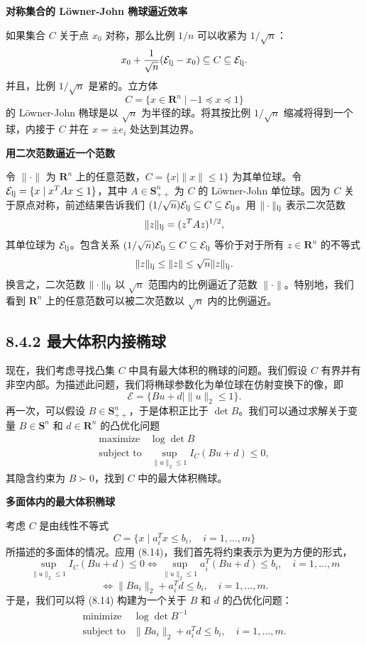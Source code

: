 \documentclass[UTF8, 12pt, fontset=fandol, oneside]{ctexart}
\begin{document}
\noindent\textbf{对称集合的 Löwner-John 椭球逼近效率}

如果集合 $C$ 关于点 $x_0$ 对称，那么比例 $1/n$ 可以收紧为 $1/\sqrt{n}$：
\[
x_0+\frac{1}{\sqrt{n}}(\mathcal{E}_{\rm lj}-x_0)\subseteq C\subseteq \mathcal{E}_{\rm lj}.
\]
并且，比例 $1/\sqrt{n}$ 是紧的。立方体
\[
C=\{x\in\mathbf{R}^n\mid -1\preceq x\preceq 1\}
\]
的 Löwner-John 椭球是以 $\sqrt{n}$ 为半径的球。将其按比例 $1/\sqrt{n}$ 缩减将得到一个球，内接于 $C$ 并在 $x=\pm e_i$ 处达到其边界。

\noindent\textbf{用二次范数逼近一个范数}

令 $\|\cdot\|$ 为 $\mathbf{R}^n$ 上的任意范数，$C=\{x\mid \|x\|\leq 1\}$ 为其单位球。令 $\mathcal{E}_{\rm lj}=\{x\mid x^TAx\leq 1\}$，其中 $A\in\mathbf{S}_{++}^n$ 为 $C$ 的 Löwner-John 单位球。因为 $C$ 关于原点对称，前述结果告诉我们 $(1/\sqrt{n})\mathcal{E}_{\rm lj}\subseteq C\subseteq \mathcal{E}_{\rm lj}$。用 $\|\cdot\|_{\rm lj}$ 表示二次范数
\[
\|z\|_{\rm lj}=(z^TAz)^{1/2},
\]
其单位球为 $\mathcal{E}_{\rm lj}$。包含关系 $(1/\sqrt{n})\mathcal{E}_{\rm lj}\subseteq C\subseteq \mathcal{E}_{\rm lj}$ 等价于对于所有 $z\in\mathbf{R}^n$ 的不等式
\[
\|z\|_{\rm lj}\leq \|z\|\leq \sqrt{n}\|z\|_{\rm lj}.
\]
换言之，二次范数 $\|\cdot\|_{\rm lj}$ 以 $\sqrt{n}$ 范围内的比例逼近了范数 $\|\cdot\|$。特别地，我们看到 $\mathbf{R}^n$ 上的任意范数可以被二次范数以 $\sqrt{n}$ 内的比例逼近。

\subsection*{8.4.2 最大体积内接椭球}

现在，我们考虑寻找凸集 $C$ 中具有最大体积的椭球的问题。我们假设 $C$ 有界并有非空内部。为描述此问题，我们将椭球参数化为单位球在仿射变换下的像，即
\[
\mathcal{E}=\{Bu+d\mid \|u\|_2\leq 1\}.
\]
再一次，可以假设 $B\in\mathbf{S}_{++}^n$，于是体积正比于 $\det B$。我们可以通过求解关于变量 $B\in\mathbf{S}^n$ 和 $d\in\mathbf{R}^n$ 的凸优化问题
\[
\begin{array}{ll}
\mbox{maximize} & \log\det B\\
\mbox{subject to} & \sup_{\|u\|_2\leq 1} I_C(Bu+d)\leq 0,
\end{array}
\tag{8.14}
\]
其隐含约束为 $B\succ 0$，找到 $C$ 中的最大体积椭球。

\noindent\textbf{多面体内的最大体积椭球}

考虑 $C$ 是由线性不等式
\[
C=\{x\mid a_i^Tx\leq b_i,\quad i=1,\ldots,m\}
\]
所描述的多面体的情况。应用 (8.14)，我们首先将约束表示为更为方便的形式，
\[
\sup_{\|u\|_2\leq 1} I_C(Bu+d)\leq 0
\Longleftrightarrow
\sup_{\|u\|_2\leq 1} a_i^T(Bu+d)\leq b_i,\quad i=1,\ldots,m
\]
\[
\Longleftrightarrow \|Ba_i\|_2+a_i^Td\leq b_i,\quad i=1,\ldots,m.
\]
于是，我们可以将 (8.14) 构建为一个关于 $B$ 和 $d$ 的凸优化问题：
\[
\begin{array}{ll}
\mbox{minimize} & \log\det B^{-1}\\
\mbox{subject to} & \|Ba_i\|_2+a_i^Td\leq b_i,\quad i=1,\ldots,m.
\end{array}
\tag{8.15}
\]
\end{document}
